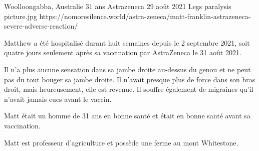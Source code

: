 {Woolloongabba, Australie}
{31 ans}
{Astrazeneca}
{29 août 2021}
{Legs paralysis}
{picture.jpg}
{https://nomoresilence.world/astra-zeneca/matt-franklin-astrazeneca-severe-adverse-reaction/}
{

Matthew a été hospitalisé durant huit semaines depuis le 2 septembre 2021, soit
quatre jours seulement après sa vaccination par AstraZeneca le 31 août 2021.

Il n'a plus aucune sensation dans sa jambe droite au-dessus du genou et ne peut
pas du tout bouger sa jambe droite. Il n'avait presque plus de force dans son
bras droit, mais heureusement, elle est revenue. Il souffre également de
migraines qu'il n'avait jamais eues avant le vaccin.

Matt était un homme de 31 ans en bonne santé et était en bonne santé avant sa
vaccination.

Matt est professeur d'agriculture et possède une ferme au mont Whitestone.

}
